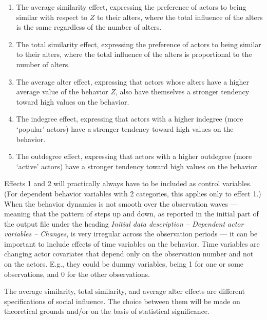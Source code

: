 \documentclass[a4paper,fleqn,11pt]{article}
\newcommand{\+}{\, + \,}
\begin{document}
{\begin{enumerate}
\item The average similarity effect, expressing the preference of actors
      to being similar with respect to $Z$ to their alters,
      where the total influence of the alters is the same
      regardless of the number of alters.
\item The total similarity effect, expressing the preference of actors
      to being similar to their alters,
      where the total influence of the alters is proportional to
      the number of alters.
\item The average alter effect, expressing that actors
      whose alters have a higher average value of the behavior $Z$,
      also have themselves a stronger tendency toward high values on the behavior.
\item The indegree effect, expressing that actors with a higher indegree
      (more `popular' actors) have a stronger tendency toward high values on the behavior.
\item The outdegree effect, expressing that actors with a higher outdegree
      (more `active' actors) have a stronger tendency toward high values on the behavior.
\end{enumerate}
Effects 1 and 2 will practically always have to be included as control variables.
(For dependent behavior variables with 2 categories, this applies only to effect 1.)
When the behavior dynamics is not smooth over the observation waves --- meaning that
the pattern of steps up and down, as reported in the initial part of the output
file under the heading \emph{Initial data description -- Dependent actor variables -- Changes},
is very irregular across the observation periods --- it can be important to include
effects of time variables on the behavior.
Time variables are changing actor covariates that depend only on the
observation number and not on the actors. E.g., they could be dummy variables, being 1
for one or some observations, and 0 for the other observations.

The average similarity, total similarity, and average alter effects
are different specifications of social influence.
The choice between them will be made on theoretical grounds
and/or on the basis of statistical significance.
\medskip

}
\end{document}
